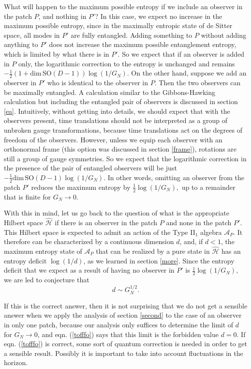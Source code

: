 \documentclass[11pt,a4paper]{article}
\def\dim{{\mathrm{dim}}}
\def\be{\begin{equation}}
\def\ee{\end{equation}}
\def\h{\widehat}
\def\A{{\mathcal A}}
\def\h{\widehat}
\def\H{{\mathcal H}}
\def\SO{{\mathrm{SO}}}
\begin{document}
What will happen to the maximum possible entropy 
 if we include an observer in the patch $P$, and nothing in $P'$?  In this case, we expect no increase in the
maximum possible
entropy, since in the maximally entropic state of de Sitter space, all modes in $P'$ are  fully entangled.  Adding something to $P$ without adding anything to $P'$ does
not increase the maximum possible entanglement entropy, which is limited by what there is in $P'$.   
  So we expect that if an observer is added in $P$ only, the logarithmic correction to the entropy
is unchanged and remains $-\frac{1}{2}(1+\dim\,\SO(D-1))\log(1/G_N)$.    On the other hand, suppose we add an observer in $P'$ who is identical to the observer in $P$.   
Then the two observers can be maximally entangled.  A calculation similar to the Gibbons-Hawking calculation but including the entangled pair of observers
is discussed in section \ref{ea}.   Intuitively, without getting into details,
 we should expect that with the observers present, time translations should not be interpreted as a group of unbroken
gauge transformations, because time translations act on the degrees of freedom of the observers.   However, unless we equip each observer with an 
orthonormal frame (this option was discussed in section \ref{frame}), rotations are still a group of gauge symmetries.   So we expect that the logarithmic
correction in the presence of the pair of entangled observers will be just $-\frac{1}{2} \dim\,\SO(D-1)\log (1/G_N)$.
In other words,  omitting an observer from the patch $P'$ reduces the maximum entropy by $\frac{1}{2}\log (1/G_N),$ up to a remainder that is finite for $G_N\to 0$.

With this in mind, let us go back to the question of what is the appropriate Hilbert space $\h\H$ if there is an observer in the patch $P$ and none in the patch
$P'$.   This Hilbert space is expected to admit an action of the Type II$_1$ algebra $\A_P$.   It therefore can be characterized by a continuous dimension $d$,
and, if $d<1$,  the maximum entropy state of $\A_P$ that can be realized by a pure state in $\h\H$ has an entropy deficit $\log (1/d)$, as we learned in section \ref{more}.
Since the entropy deficit that we expect as a result of having no observer in $P'$ is $\frac{1}{2}\log (1/G_N), $ we are led to conjecture that
\be\label{tofffo} d\sim G_N^{1/2} .\ee


If this is the correct answer, then it is not surprising that we do not get a sensible answer when we apply the analysis of section \ref{second} to the case of an observer
in only one patch, because our analysis only suffices to determine the limit of $d$ for $G_N\to 0$, and eqn. (\ref{tofffo}) says that this limit is the forbidden value
$d=0$.     If eqn. (\ref{tofffo}) is correct, some sort of quantum correction is needed in order to get a sensible result.
Possibly it is important to take into account fluctuations in the
horizon.
\end{document}
